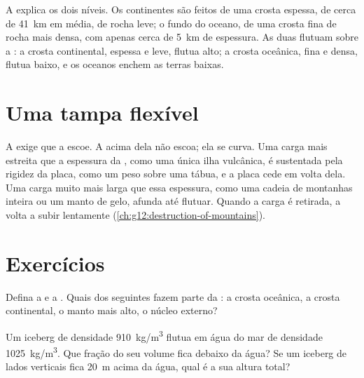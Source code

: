 A  explica os dois níveis. Os continentes são feitos de uma crosta
espessa, de cerca de \qty{41}{km} em média, de rocha leve; o fundo do oceano,
de uma crosta fina de rocha mais densa, com apenas cerca de \qty{5}{km} de
espessura. As duas flutuam sobre a : a crosta continental,
espessa e leve, flutua alto; a crosta oceânica, fina e densa, flutua baixo,
e os oceanos enchem as terras baixas.

\section{Uma tampa flexível}

A  exige que a  escoe. A  acima dela não escoa;
ela se curva. Uma carga mais estreita que a espessura da , como uma
única ilha vulcânica, é sustentada pela rigidez da placa, como um peso sobre
uma tábua, e a placa cede em volta dela. Uma carga muito mais larga que essa
espessura, como uma cadeia de montanhas inteira ou um manto de gelo, afunda
até flutuar. Quando a carga é retirada, a  volta a subir lentamente
(\cref{ch:g12:destruction-of-mountains}).

\section{Exercícios}

\begin{exercise}[$\star$]\label{exo:g11:lithosphere-asthenosphere:1}
Defina a  e a . Quais dos seguintes fazem parte da
: a crosta oceânica, a crosta continental, o manto mais alto, o
núcleo externo?
\end{exercise}

\begin{exercise}[$\star$]\label{exo:g11:lithosphere-asthenosphere:2}
Um iceberg de densidade \qty{910}{kg/m^3} flutua em água do mar de
densidade \qty{1025}{kg/m^3}. Que fração do seu volume fica debaixo da
água? Se um iceberg de lados verticais fica \qty{20}{m} acima da água, qual
é a sua altura total?
\end{exercise}

